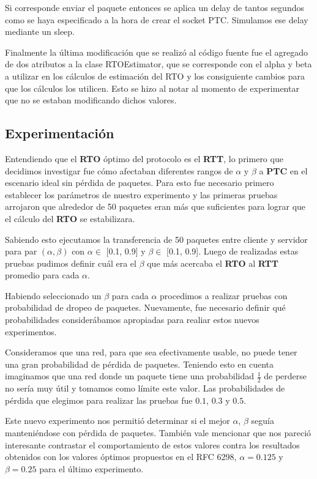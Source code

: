Si corresponde enviar el paquete entonces se aplica un delay de tantos segundos como se haya especificado a la hora de crear el socket PTC. Simulamos ese delay mediante un sleep.\newline

Finalmente la última modificación que se realizó al código fuente fue el agregado de dos atributos a la clase RTOEstimator, que se corresponde con el alpha y beta a utilizar en los cálculos de estimación del RTO y los consiguiente cambios para que los cálculos los utilicen. Esto se hizo al notar al momento de experimentar que no se estaban modificando dichos valores.\newline

\subsection{Experimentación}

Entendiendo que el \textbf{RTO} óptimo del protocolo es el \textbf{RTT}, lo primero que decidimos investigar fue cómo afectaban diferentes rangos de $\alpha$ y $\beta$ a \textbf{PTC} en el escenario ideal sin pérdida de paquetes. Para esto fue necesario primero establecer los parámetros de nuestro experimento y las primeras pruebas arrojaron que alrededor de 50 paquetes eran más que suficientes para lograr que el cálculo del \textbf{RTO} se estabilizara.\newline

Sabiendo esto ejecutamos la transferencia de 50 paquetes entre cliente y servidor para par $(\alpha, \beta)$ con $\alpha \in$ [0.1, 0.9] y $\beta \in$ [0.1, 0.9]. Luego de realizadas estas pruebas pudimos definir cuál era el $\beta$ que más acercaba el \textbf{RTO} al \textbf{RTT} promedio para cada $\alpha$.\newline

Habiendo seleccionado un $\beta$ para cada $\alpha$ procedimos a realizar pruebas con probabilidad de dropeo de paquetes. Nuevamente, fue necesario definir qué probabilidades considerábamos apropiadas para realiar estos nuevos experimentos.\newline

Consideramos que una red, para que sea efectivamente usable, no puede tener una gran probabilidad de pérdida de paquetes. Teniendo esto en cuenta imaginamos que una red donde un paquete tiene una probabilidad $\frac{1}{2}$ de perderse no sería muy útil y tomamos como límite este valor. Las probabilidades de pérdida que elegimos para realizar las pruebas fue $0.1$, $0.3$ y $0.5$.\newline

Este nuevo experimento nos permitió determinar si el mejor $\alpha$, $\beta$ seguía manteniéndose con pérdida de paquetes. También vale mencionar que nos pareció interesante contrastar el comportamiento de estos valores contra los resultados obtenidos con los valores óptimos propuestos en el RFC 6298, $\alpha = 0.125$ y $\beta = 0.25$ para el último experimento.

